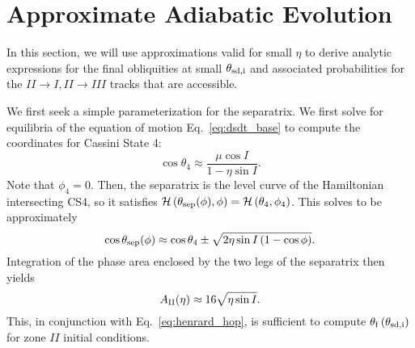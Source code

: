 \documentclass[
        fleqn,
        usenatbib,
        referee,
    ]{mnras}
\newcommand*{\p}[1]{\left(#1\right)}
\begin{document}
\section{Approximate Adiabatic Evolution}\label{s:ad_approx}

In this section, we will use approximations valid for small $\eta$ to derive
analytic expressions for the final obliquities at small $\theta_{\rm sd, i}$ and
associated probabilities for the $II \to I, II \to III$ tracks that are
accessible.

We first seek a simple parameterization for the separatrix. We first solve for
equilibria of the equation of motion Eq.~\eqref{eq:dsdt_base} to compute the
coordinates for Cassini State 4:
\begin{equation}
    \cos \theta_4 \approx \frac{\mu \cos I}{1 - \eta \sin I}.
\end{equation}
Note that $\phi_4 = 0$. Then, the separatrix is the level curve of the
Hamiltonian intersecting CS4, so it satisfies $\mathcal{H}\p{\theta_{\rm
sep}(\phi), \phi} = \mathcal{H}\p{\theta_4, \phi_4}$. This solves to be
approximately
\begin{equation}
    \cos \theta_{\rm sep}(\phi) \approx \cos \theta_4 \pm
        \sqrt{2\eta \sin I\p{1 - \cos \phi}}.
\end{equation}
Integration of the phase area enclosed by the two legs of the separatrix then
yields
\begin{equation}
    A_{\rm II}(\eta) \approx 16\sqrt{\eta \sin I}.\label{eq:a_approx}
\end{equation}
This, in conjunction with Eq.~\eqref{eq:henrard_hop}, is sufficient to compute
$\theta_{\rm f}\p{\theta_{\rm sd, i}}$ for zone $II$ initial conditions.
\end{document}
